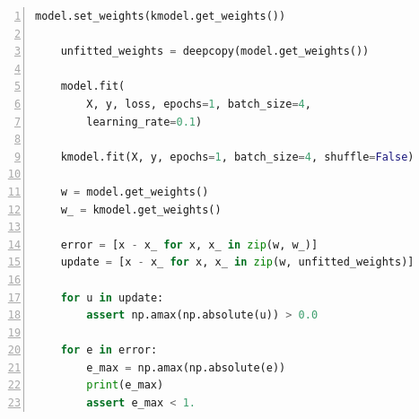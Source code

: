 \documentclass[]{article}
\begin{document}
\begin{appendices}
\begin{lstlisting}[language=Python, caption={Excerpt from the test
  suite showing the biggest CNN trained with the prototye, without
  dropped packets.}, captionpos=b, numbers=left,
  label={lst:training_cnn}]
    model.set_weights(kmodel.get_weights())

    unfitted_weights = deepcopy(model.get_weights())

    model.fit(
        X, y, loss, epochs=1, batch_size=4,
        learning_rate=0.1)

    kmodel.fit(X, y, epochs=1, batch_size=4, shuffle=False)

    w = model.get_weights()
    w_ = kmodel.get_weights()

    error = [x - x_ for x, x_ in zip(w, w_)]
    update = [x - x_ for x, x_ in zip(w, unfitted_weights)]

    for u in update:
        assert np.amax(np.absolute(u)) > 0.0

    for e in error:
        e_max = np.amax(np.absolute(e))
        print(e_max)
        assert e_max < 1.
\end{lstlisting}

\end{appendices}
\end{document}
